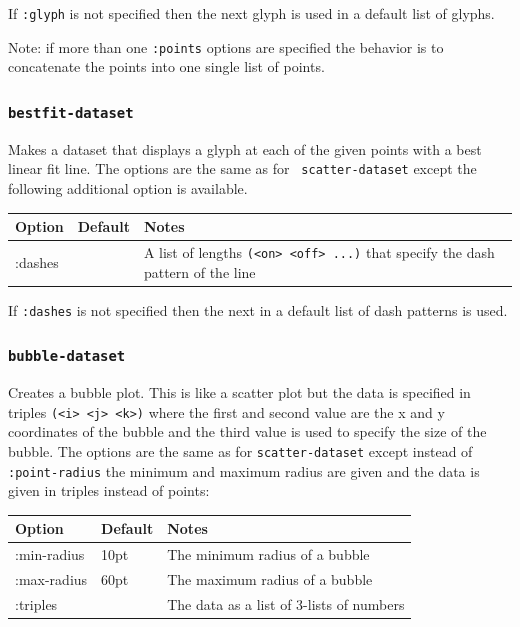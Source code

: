 \documentclass{article}
\begin{document}
If {\tt :glyph} is not specified then the next glyph is used in a
default list of glyphs.

Note: if more than one {\tt :points} options are specified the
behavior is to concatenate the points into one single list of points.

\subsubsection{\tt bestfit-dataset}

Makes a dataset that displays a glyph at each of the given points with
a best linear fit line.  The options are the same as for {\tt
  scatter-dataset} except the following additional option is
available.

\begin{center}
\begin{tabular}{lll}
Option & Default & Notes \\
\hline
:dashes & & A list of lengths {\tt (<on> <off> ...)} that specify the
dash pattern of the line\\
\end{tabular}
\end{center}

If {\tt :dashes} is not specified then the next in a default list of
dash patterns is used.

\subsubsection{\tt bubble-dataset}

Creates a bubble plot.  This is like a scatter plot but the data is
specified in triples {\tt (<i> <j> <k>)} where the first and second
value are the x and y coordinates of the bubble and the third value is
used to specify the size of the bubble.  The options are the same as
for {\tt scatter-dataset} except instead of {\tt :point-radius} the
minimum and maximum radius are given and the data is given in triples
instead of points:

\begin{center}
\begin{tabular}{lll}
Option & Default & Notes \\
\hline
:min-radius & 10pt & The minimum radius of a bubble\\
:max-radius & 60pt & The maximum radius of a bubble\\
:triples & & The data as a list of 3-lists of numbers\\
\end{tabular}
\end{center}
\end{document}
